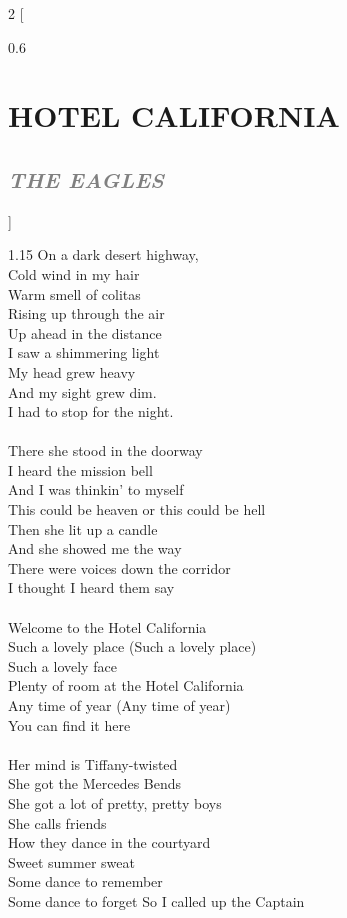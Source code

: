 \documentclass[100pt,a4paper]{report}
\newenvironment{song2}[2]
	{	
    	\begin{multicols*}{2}
		[
			\begin{spacing}{0.6}
				\section*{\LARGE\centering \MakeUppercase{\textbf{{#1}}}}
				\subsection*{\Large\centering \textit{\textcolor{gray}{\MakeUppercase{{#2}}}}}
			\end{spacing}
		]
		\Large
	}
	{
	\end{multicols*}
	\newpage
    }
\begin{document}
\begin{song2}{Hotel California}{The Eagles}
\begin{spacing}{1.15}
\noindent
On a dark desert highway,\\ 
Cold wind in my hair\\
Warm smell of colitas \\
Rising up through the air\\
Up ahead in the distance\\ 
I saw a shimmering light\\
My head grew heavy \\
And my sight grew dim.\\
I had to stop for the night.\\
\\
There she stood in the doorway \\
I heard the mission bell\\
And I was thinkin' to myself\\
This could be heaven or this could be hell\\
Then she lit up a candle \\
And she showed me the way\\
There were voices down the corridor\\ 
I thought I heard them say\\
\\
Welcome to the Hotel California\\
Such a lovely place (Such a lovely place)\\ 
Such a lovely face\\
Plenty of room at the Hotel California\\
Any time of year (Any time of year)\\ 
You can find it here\\
\\
Her mind is Tiffany-twisted\\ 
She got the Mercedes Bends\\
She got a lot of pretty, pretty boys\\ 
She calls friends\\
How they dance in the courtyard\\ 
Sweet summer sweat\\
Some dance to remember\\ 
Some dance to forget
\vfill
\columnbreak
\noindent
So I called up the Captain\\ 

\end{spacing}
\end{song2}
\end{document}
